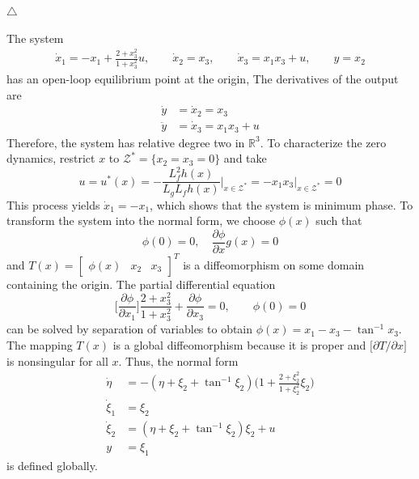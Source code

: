 \documentclass[12pt,a4paper,oneside]{book}
\begin{document}
\begin{onehalfspace}
\begin{example}
	\hfill $\triangle$
\end{example}
\begin{example}
	The system
	\begin{equation*}
	\begin{aligned}
		\dot{x}_1=-x_1+\frac{2+x_3^2}{1+x_3^2}u,\qquad
		\dot{x}_2=x_3,\qquad
		\dot{x}_3=x_1x_3+u,\qquad
		y=x_2
	\end{aligned}
	\end{equation*}
	has an open-loop equilibrium point at the origin, The derivatives of the output are
	\begin{equation*}
	\begin{aligned}
		\dot{y}&=\dot{x}_2=x_3 \\[6pt]
		\ddot{y}&=\dot{x}_3=x_1x_3+u
	\end{aligned}
	\end{equation*}	
	Therefore, the system has relative degree two in $\mathbb{R}^3$. To characterize the zero dynamics, restrict $x$ to $\mathscr{Z}^*=\{x_2=x_3=0\}$ and take
	\begin{equation*}
		u=u^*(x)=-\frac{L_f^2h(x)}{L_gL_fh(x)}\Big|_{x\in\mathscr{Z}^*}=-x_1x_3\Big|_{x\in\mathscr{Z}^*}=0
	\end{equation*}
	This process yields $\dot{x}_1=-x_1$, which shows that the system is minimum phase. To transform the system into the normal form, we choose $\phi(x)$ such that 
	\begin{equation*}
		\phi(0)=0,\quad\frac{\partial \phi}{\partial x}g(x)=0
	\end{equation*}
	and $T(x)=\begin{bmatrix} \phi(x)&x_2&x_3 \end{bmatrix}^T$ is a diffeomorphism on some domain containing the origin. The partial differential equation
	\begin{equation*}
		\Bigg[\frac{\partial \phi}{\partial x_1}\Bigg]\frac{2+x_3^2}{1+x_3^2}+\frac{\partial \phi}{\partial x_3}=0,\qquad\phi(0)=0
	\end{equation*}
	can be solved by separation of variables to obtain $\phi(x)=x_1-x_3-\tan^{-1}x_3$. The mapping $T(x)$ is a global diffeomorphism because it is proper and $\big[\partial T/\partial x\big]$ is nonsingular for all $x$. Thus, the normal form
	\begin{equation*}
		\begin{aligned}
			\dot{\eta} &= -(\eta+\xi_2+\tan^{-1}\xi_2)\Big(1+\frac{2+\xi_2^2}{1+\xi_2^2}\xi_2\Big) \\[6pt]
			\dot{\xi}_1 &= \xi_2 \\[6pt]
			\dot{\xi}_2 &= (\eta+\xi_2+\tan^{-1}\xi_2)\xi_2+u\\[6pt]
			y&=\xi_1
		\end{aligned}
	\end{equation*}
	is defined globally.
		

\end{example}
\end{onehalfspace}
\end{document}
